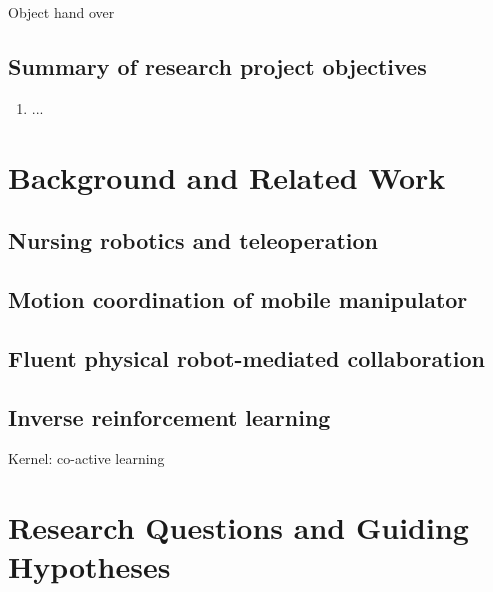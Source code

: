 \documentclass[11pt,letterpaper]{article}
\begin{document}
Object hand over

\subsection*{Summary of research project objectives}

\begin{enumerate}
    \item ...
\end{enumerate}

\section{Background and Related Work}


\subsection*{Nursing robotics and teleoperation}

\subsection*{Motion coordination of mobile manipulator}

\subsection*{Fluent physical robot-mediated collaboration}

\subsection*{Inverse reinforcement learning}




Kernel: co-active learning

\section{Research Questions and Guiding Hypotheses}
\end{document}
